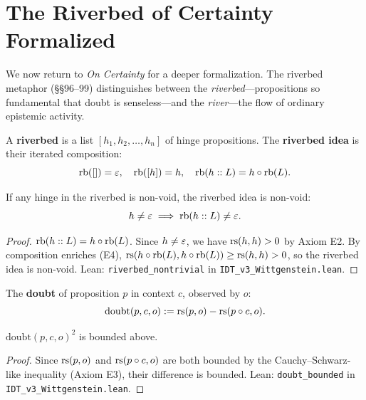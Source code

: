 \section{The Riverbed of Certainty Formalized}

We now return to \textit{On Certainty} for a deeper formalization. The
riverbed metaphor (\S\S96--99) distinguishes between the \emph{riverbed}---propositions
so fundamental that doubt is senseless---and the \emph{river}---the flow of
ordinary epistemic activity.

\begin{definition}[Riverbed]
\label{def:riverbed}
A \textbf{riverbed} is a list $[h_1, h_2, \ldots, h_n]$ of hinge propositions.
The \textbf{riverbed idea} is their iterated composition:
\[
\mathrm{rb}([]) = \varepsilon, \quad \mathrm{rb}([h]) = h, \quad
\mathrm{rb}(h :: L) = h \circ \mathrm{rb}(L).
\]
\end{definition}

\begin{theorem}
\label{thm:riverbed-nontrivial}
If any hinge in the riverbed is non-void, the riverbed idea is non-void:
\[
h \neq \varepsilon \implies \mathrm{rb}(h :: L) \neq \varepsilon.
\]
\end{theorem}

\begin{proof}
$\mathrm{rb}(h :: L) = h \circ \mathrm{rb}(L)$. Since $h \neq \varepsilon$,
we have $\mathrm{rs}(h, h) > 0$ by Axiom E2. By composition enriches (E4),
$\mathrm{rs}(h \circ \mathrm{rb}(L), h \circ \mathrm{rb}(L)) \geq \mathrm{rs}(h, h) > 0$,
so the riverbed idea is non-void.
Lean: \texttt{riverbed\_nontrivial} in \texttt{IDT\_v3\_Wittgenstein.lean}.
\end{proof}

\begin{definition}[Doubt]
\label{def:doubt}
The \textbf{doubt} of proposition $p$ in context $c$, observed by $o$:
\[
\mathrm{doubt}(p, c, o) := \mathrm{rs}(p, o) - \mathrm{rs}(p \circ c, o).
\]
\end{definition}

\begin{theorem}
\label{thm:doubt-bounded}
$\mathrm{doubt}(p, c, o)^2$ is bounded above.
\end{theorem}

\begin{proof}
Since $\mathrm{rs}(p, o)$ and $\mathrm{rs}(p \circ c, o)$ are both bounded by the
Cauchy--Schwarz-like inequality (Axiom E3), their difference is bounded.
Lean: \texttt{doubt\_bounded} in \texttt{IDT\_v3\_Wittgenstein.lean}.
\end{proof}

